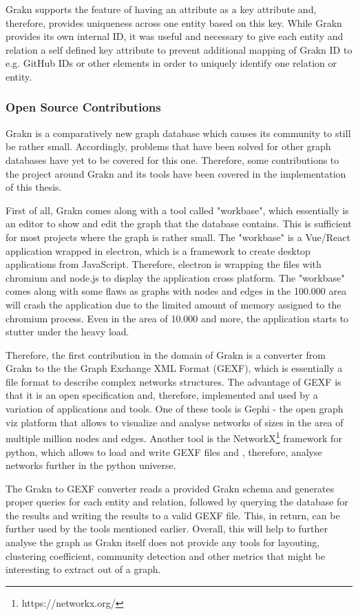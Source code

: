 Grakn supports the feature of having an attribute as a key attribute and, therefore, provides uniqueness across one entity based on this key. While Grakn provides its own internal ID, it was useful and necessary to give each entity and relation a self defined key attribute to prevent additional mapping of Grakn ID to e.g. GitHub IDs or other elements in order to uniquely identify one relation or entity.

\subsubsection{Open Source Contributions}
Grakn is a comparatively new graph database which causes its community to still be rather small. Accordingly, problems that have been solved for other graph databases have yet to be covered for this one. Therefore, some contributions to the project around Grakn and its tools have been covered in the implementation of this thesis.

First of all, Grakn comes along with a tool called "workbase", which essentially is an editor to show and edit the graph that the database contains. This is sufficient for most projects where the graph is rather small. The "workbase" is a Vue/React application wrapped in electron, which is a framework to create desktop applications from JavaScript. Therefore, electron is wrapping the files with chromium and node.js to display the application cross platform. The "workbase" comes along with some flaws as graphs with nodes and edges in the 100.000 area will crash the application due to the limited amount of memory assigned to the chromium process. Even in the area of 10.000 and more, the application starts to stutter under the heavy load.

Therefore, the first contribution in the domain of Grakn is a converter from Grakn to the the Graph Exchange XML Format (GEXF), which is essentially a file format to describe complex networks structures.
The advantage of GEXF is that it is an open specification and, therefore, implemented and used by a variation of applications and tools. One of these tools is Gephi - the open graph viz platform that allows to visualize and analyse networks of sizes in the area of multiple million nodes and edges. Another tool is the NetworkX\footnote{https://networkx.org/} framework for python, which allows to load and write GEXF files and , therefore, analyse networks further in the python universe.

The Grakn to GEXF converter reads a provided Grakn schema and generates proper queries for each entity and relation, followed by querying the database for the results and writing the results to a valid GEXF file. This, in return, can be further used by the tools mentioned earlier. Overall, this will help to further analyse the graph as Grakn itself does not provide any tools for layouting, clustering coefficient, community detection and other metrics that might be interesting to extract out of a graph.

